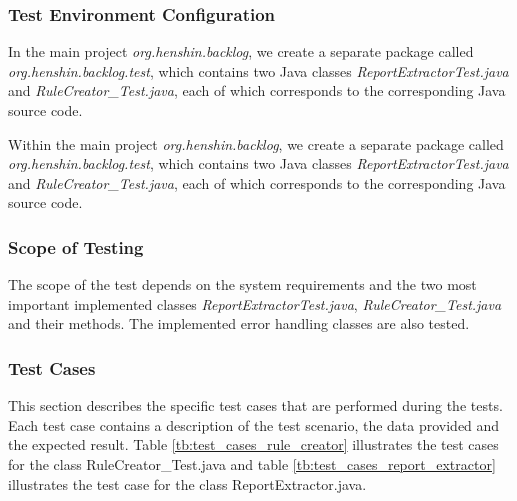 \subsubsection*{Test Environment Configuration}
In the main project \textit{org.henshin.backlog}, we create a separate package called \textit{org.henshin.backlog.test}, which contains two Java classes \textit{ReportExtractorTest.java} and \textit{RuleCreator\_Test.java}, each of which corresponds to the corresponding Java source code.

Within the main project \textit{org.henshin.backlog}, we create a separate package called \textit{org.henshin.backlog.test}, which contains two Java classes \textit{ReportExtractorTest.java} and \textit{RuleCreator\_Test.java}, each of which corresponds to the corresponding Java source code.

\subsubsection*{Scope of Testing}
The scope of the test depends on the system requirements and the two most important implemented classes \textit{ReportExtractorTest.java}, \textit{RuleCreator\_Test.java} and their methods. The implemented error handling classes are also tested.

\subsubsection*{Test Cases}
This section describes the specific test cases that are performed during the tests. Each test case contains a description of the test scenario, the data provided and the expected result. Table \ref{tb:test_cases_rule_creator} illustrates the test cases for the class RuleCreator\_Test.java and table \ref{tb:test_cases_report_extractor} illustrates the test case for the class ReportExtractor.java.

